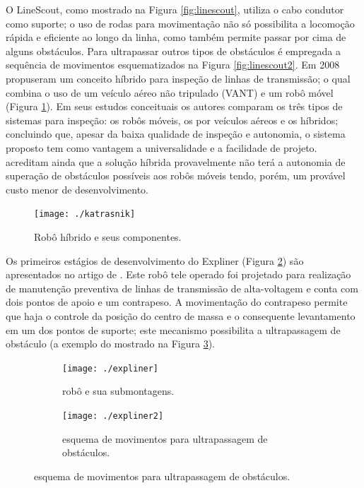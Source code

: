 O LineScout, como mostrado na Figura \ref{fig:linescout}, utiliza o cabo condutor como suporte; o uso de rodas para movimentação não só possibilita a locomoção rápida e eficiente ao longo da linha, como também permite passar por cima de alguns obstáculos. Para ultrapassar outros tipos de obstáculos é empregada a sequência de movimentos esquematizados na Figura \ref{fig:linescout2}.
Em 2008  propuseram um conceito híbrido para inspeção de linhas de transmissão; o qual combina o uso de um veículo aéreo não tripulado (VANT) e um robô móvel (Figura \ref{img:katrasnik}). Em seus estudos conceituais os autores comparam os três tipos de sistemas para inspeção: os robôs móveis, os por veículos aéreos e os híbridos; concluindo que, apesar da baixa qualidade de inspeção e autonomia, o sistema proposto tem como vantagem a universalidade e a facilidade de projeto.  acreditam ainda que a solução híbrida provavelmente não terá a autonomia de superação de obstáculos possíveis aos robôs móveis tendo, porém, um provável custo menor de desenvolvimento.  

\begin{figure}[h!]	
	\caption{Robô híbrido e seus componentes.}
	\label{img:katrasnik}											 
	\centering													 
	\texttt{[image: ./katrasnik]}
\end{figure}													 

Os primeiros estágios de desenvolvimento do Expliner (Figura \ref{img:expliner1}) são apresentados no artigo de . Este robô tele operado foi projetado para realização de manutenção preventiva de linhas de transmissão de alta-voltagem e conta com dois pontos de apoio e um contrapeso.  A movimentação do contrapeso permite que haja o controle da posição do centro de massa e o consequente levantamento em um dos pontos de suporte; este mecanismo possibilita a ultrapassagem de obstáculo (a exemplo do mostrado na Figura \ref{img:expliner2}).

\begin{figure}[h!]
		\caption{Robô Expliner.}
		\begin{subfigure}[b]{0.5\textwidth}
		  	\centering
		  	\texttt{[image: ./expliner]} 
		  	\caption{robô e sua submontagens.}
		  	\label{img:expliner1}
		\end{subfigure}
		\begin{subfigure}[b]{0.5\textwidth}
		  	\centering
		  	\texttt{[image: ./expliner2]} 
		  	\caption{esquema de movimentos para ultrapassagem de obstáculos.}
		  	\label{img:expliner2}
		\end{subfigure} 
	  \label{img:expliner}
\end{figure}


